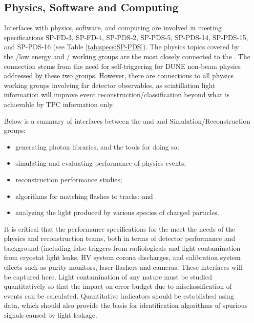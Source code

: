 \subsection{Physics, Software and Computing}


Interfaces with physics, software, and computing are involved in meeting specifications SP-FD-3, SP-FD-4, SP-PDS-2, SP-PDS-5, 
SP-PDS-14, SP-PDS-15, and SP-PDS-16 (see Table \ref{tab:specs:SP-PDS}). The physics topics covered by the
/low energy and / working groups are the most closely connected to the \single {}. The connection stems from the need for self-triggering for DUNE non-beam physics addressed by these two groups. 
However, there are connections to all physics working groups involving far detector observables, as scintillation light information will improve event reconstruction/classification beyond what is achievable by TPC information only. 

Below is a summary of interfaces between the \dune \single {} and  and  Simulation/Reconstruction groups:

\begin{itemize}
    \item generating photon libraries, and the tools for doing so;
    \item simulating and evaluating performance of physics events;
    \item \single {} reconstruction performance studies;
    \item algorithms for matching flashes to  tracks; and
    \item analyzing the light produced by various species of charged particles.
\end{itemize}

It is critical that the performance specifications for the  meet the needs of the physics and reconstruction teams, both in terms of detector performance and background (including false triggers from radiologicals and light contamination from cryostat light leaks, HV system corona discharges, and calibration system effects such as purity monitors, laser flashers and cameras.  These interfaces will be captured here.
Light contamination of any nature must be studied quantitatively so that the impact on error budget due to misclassification of events can be calculated. Quantitative indicators should be established using  data, which should also provide the basis for identification algorithms of spurious signals caused by light leakage. 

